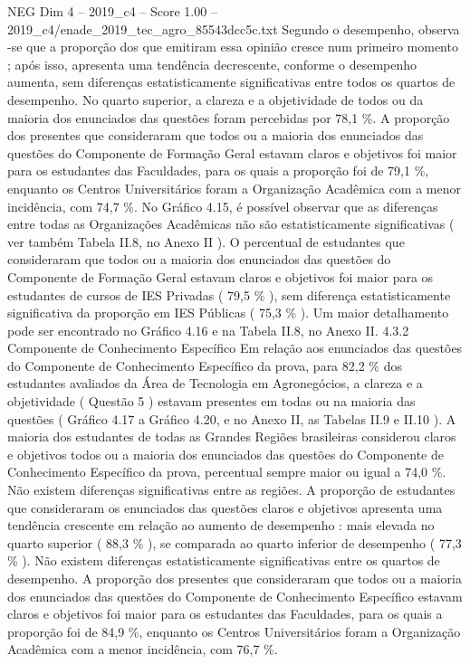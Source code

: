 \begin{textsample}{NEG Dim 4 – 2019\_c4 – Score 1.00 – 2019\_c4/enade\_2019\_tec\_agro\_85543dcc5c.txt}
Segundo o desempenho, observa -se que a proporção dos que emitiram essa opinião cresce num primeiro momento ; após isso, apresenta uma tendência decrescente, conforme o desempenho aumenta, sem diferenças estatisticamente significativas entre todos os quartos de desempenho.
No quarto superior, a clareza e a objetividade de todos ou da maioria dos enunciados das questões foram percebidas por 78,1 \%.
A proporção dos presentes que consideraram que todos ou a maioria dos enunciados das questões do Componente de Formação Geral estavam claros e objetivos foi maior para os estudantes das Faculdades, para os quais a proporção foi de 79,1 \%, enquanto os Centros Universitários foram a Organização Acadêmica com a menor incidência, com 74,7 \%.
No Gráfico 4.15, é possível observar que as diferenças entre todas as Organizações Acadêmicas não são estatisticamente significativas ( ver também Tabela II.8, no Anexo II ).
O percentual de estudantes que consideraram que todos ou a maioria dos enunciados das questões do Componente de Formação Geral estavam claros e objetivos foi maior para os estudantes de cursos de IES Privadas ( 79,5 \% ), sem diferença estatisticamente significativa da proporção em IES Públicas ( 75,3 \% ).
Um maior detalhamento pode ser encontrado no Gráfico 4.16 e na Tabela II.8, no Anexo II. 4.3.2 Componente de Conhecimento Específico Em relação aos enunciados das questões do Componente de Conhecimento Específico da prova, para 82,2 \% dos estudantes avaliados da Área de Tecnologia em Agronegócios, a clareza e a objetividade ( Questão 5 ) estavam presentes em todas ou na maioria das questões ( Gráfico 4.17 a Gráfico 4.20, e no Anexo II, as Tabelas II.9 e II.10 ).
A maioria dos estudantes de todas as Grandes Regiões brasileiras considerou claros e objetivos todos ou a maioria dos enunciados das questões do Componente de Conhecimento Específico da prova, percentual sempre maior ou igual a 74,0 \%.
Não existem diferenças significativas entre as regiões.
A proporção de estudantes que consideraram os enunciados das questões claros e objetivos apresenta uma tendência crescente em relação ao aumento de desempenho : mais elevada no quarto superior ( 88,3 \% ), se comparada ao quarto inferior de desempenho ( 77,3 \% ).
Não existem diferenças estatisticamente significativas entre os quartos de desempenho.
A proporção dos presentes que consideraram que todos ou a maioria dos enunciados das questões do Componente de Conhecimento Específico estavam claros e objetivos foi maior para os estudantes das Faculdades, para os quais a proporção foi de 84,9 \%, enquanto os Centros Universitários foram a Organização Acadêmica com a menor incidência, com 76,7 \%.

\end{textsample}
